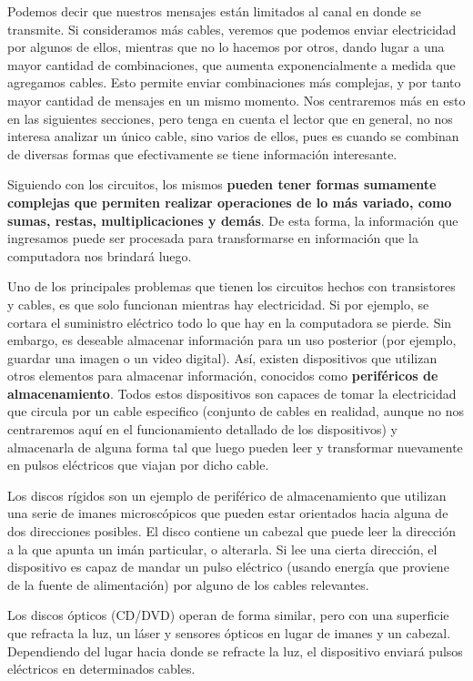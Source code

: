 Podemos decir que nuestros mensajes están limitados al canal en donde se
transmite. Si consideramos más cables, veremos que podemos enviar electricidad
por algunos de ellos, mientras que no lo hacemos por otros, dando lugar a una
mayor cantidad de combinaciones, que aumenta exponencialmente a medida que
agregamos cables. Esto permite enviar combinaciones más complejas, y por tanto
mayor cantidad de mensajes en un mismo momento. Nos centraremos más en esto en
las siguientes secciones, pero tenga en cuenta el lector que en general, no nos
interesa analizar un único cable, sino varios de ellos, pues es cuando se
combinan de diversas formas que efectivamente se tiene información interesante.

Siguiendo con los circuitos, los mismos \textbf{pueden tener formas sumamente
complejas que permiten realizar operaciones de lo más variado, como sumas,
restas, multiplicaciones y demás}. De esta forma, la información que ingresamos
puede ser procesada para transformarse en información que la computadora nos
brindará luego.\autocite[cap. 1]{nisan_2005}

Uno de los principales problemas que tienen los circuitos hechos con
transistores y cables, es que solo funcionan mientras hay electricidad. Si por
ejemplo, se cortara el suministro eléctrico todo lo que hay en la computadora se
pierde. Sin embargo, es deseable almacenar información para un uso posterior
(por ejemplo, guardar una imagen o un video digital). Así, existen dispositivos
que utilizan otros elementos para almacenar información, conocidos como
\textbf{periféricos de almacenamiento}. Todos estos dispositivos son capaces de
tomar la electricidad que circula por un cable especifico (conjunto de cables en
realidad, aunque no nos centraremos aquí en el funcionamiento detallado de los
dispositivos) y almacenarla de alguna forma tal que luego pueden leer y
transformar nuevamente en pulsos eléctricos que viajan por dicho cable.

Los discos rígidos son un ejemplo de periférico de almacenamiento que utilizan
una serie de imanes microscópicos que pueden estar orientados hacia alguna de
dos direcciones posibles. El disco contiene un cabezal que puede leer la
dirección a la que apunta un imán particular, o alterarla. Si lee una cierta
dirección, el dispositivo es capaz de mandar un pulso eléctrico (usando energía
que proviene de la fuente de alimentación) por alguno de los cables relevantes.

Los discos ópticos (CD/DVD) operan de forma similar, pero con una superficie que
refracta la luz, un láser y sensores ópticos en lugar de imanes y un cabezal.
Dependiendo del lugar hacia donde se refracte la luz, el dispositivo enviará
pulsos eléctricos en determinados cables.

